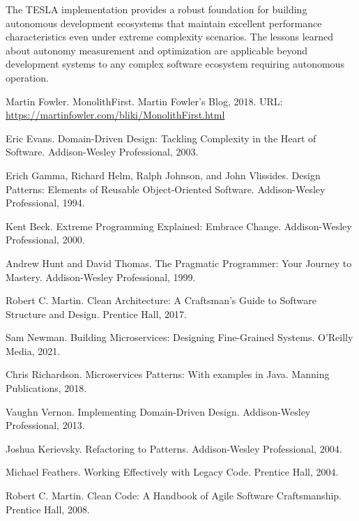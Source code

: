 \documentclass[10pt]{article}
\begin{document}
The TESLA implementation provides a robust foundation for building autonomous development ecosystems that maintain excellent performance characteristics even under extreme complexity scenarios. The lessons learned about autonomy measurement and optimization are applicable beyond development systems to any complex software ecosystem requiring autonomous operation.


\begin{thebibliography}{99}
 Martin Fowler. MonolithFirst. Martin Fowler's Blog, 2018. URL: \url{https://martinfowler.com/bliki/MonolithFirst.html}

 Eric Evans. Domain-Driven Design: Tackling Complexity in the Heart of Software. Addison-Wesley Professional, 2003.

 Erich Gamma, Richard Helm, Ralph Johnson, and John Vlissides. Design Patterns: Elements of Reusable Object-Oriented Software. Addison-Wesley Professional, 1994.

 Kent Beck. Extreme Programming Explained: Embrace Change. Addison-Wesley Professional, 2000.

 Andrew Hunt and David Thomas. The Pragmatic Programmer: Your Journey to Mastery. Addison-Wesley Professional, 1999.

 Robert C. Martin. Clean Architecture: A Craftsman's Guide to Software Structure and Design. Prentice Hall, 2017.

 Sam Newman. Building Microservices: Designing Fine-Grained Systems. O'Reilly Media, 2021.

 Chris Richardson. Microservices Patterns: With examples in Java. Manning Publications, 2018.

 Vaughn Vernon. Implementing Domain-Driven Design. Addison-Wesley Professional, 2013.

 Joshua Kerievsky. Refactoring to Patterns. Addison-Wesley Professional, 2004.

 Michael Feathers. Working Effectively with Legacy Code. Prentice Hall, 2004.

 Robert C. Martin. Clean Code: A Handbook of Agile Software Craftsmanship. Prentice Hall, 2008.
\end{thebibliography}
\end{document}
